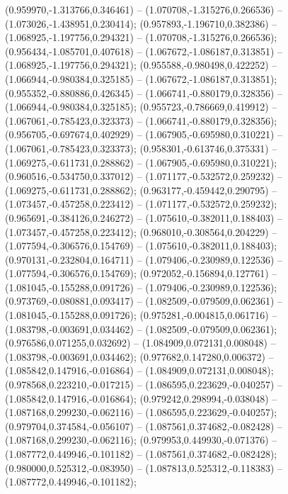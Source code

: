  (0.959970,-1.313766,0.346461) -- (1.070708,-1.315276,0.266536) -- (1.073026,-1.438951,0.230414);
 (0.957893,-1.196710,0.382386) -- (1.068925,-1.197756,0.294321) -- (1.070708,-1.315276,0.266536);
 (0.956434,-1.085701,0.407618) -- (1.067672,-1.086187,0.313851) -- (1.068925,-1.197756,0.294321);
 (0.955588,-0.980498,0.422252) -- (1.066944,-0.980384,0.325185) -- (1.067672,-1.086187,0.313851);
 (0.955352,-0.880886,0.426345) -- (1.066741,-0.880179,0.328356) -- (1.066944,-0.980384,0.325185);
 (0.955723,-0.786669,0.419912) -- (1.067061,-0.785423,0.323373) -- (1.066741,-0.880179,0.328356);
 (0.956705,-0.697674,0.402929) -- (1.067905,-0.695980,0.310221) -- (1.067061,-0.785423,0.323373);
 (0.958301,-0.613746,0.375331) -- (1.069275,-0.611731,0.288862) -- (1.067905,-0.695980,0.310221);
 (0.960516,-0.534750,0.337012) -- (1.071177,-0.532572,0.259232) -- (1.069275,-0.611731,0.288862);
 (0.963177,-0.459442,0.290795) -- (1.073457,-0.457258,0.223412) -- (1.071177,-0.532572,0.259232);
 (0.965691,-0.384126,0.246272) -- (1.075610,-0.382011,0.188403) -- (1.073457,-0.457258,0.223412);
 (0.968010,-0.308564,0.204229) -- (1.077594,-0.306576,0.154769) -- (1.075610,-0.382011,0.188403);
 (0.970131,-0.232804,0.164711) -- (1.079406,-0.230989,0.122536) -- (1.077594,-0.306576,0.154769);
 (0.972052,-0.156894,0.127761) -- (1.081045,-0.155288,0.091726) -- (1.079406,-0.230989,0.122536);
 (0.973769,-0.080881,0.093417) -- (1.082509,-0.079509,0.062361) -- (1.081045,-0.155288,0.091726);
 (0.975281,-0.004815,0.061716) -- (1.083798,-0.003691,0.034462) -- (1.082509,-0.079509,0.062361);
 (0.976586,0.071255,0.032692) -- (1.084909,0.072131,0.008048) -- (1.083798,-0.003691,0.034462);
 (0.977682,0.147280,0.006372) -- (1.085842,0.147916,-0.016864) -- (1.084909,0.072131,0.008048);
 (0.978568,0.223210,-0.017215) -- (1.086595,0.223629,-0.040257) -- (1.085842,0.147916,-0.016864);
 (0.979242,0.298994,-0.038048) -- (1.087168,0.299230,-0.062116) -- (1.086595,0.223629,-0.040257);
 (0.979704,0.374584,-0.056107) -- (1.087561,0.374682,-0.082428) -- (1.087168,0.299230,-0.062116);
 (0.979953,0.449930,-0.071376) -- (1.087772,0.449946,-0.101182) -- (1.087561,0.374682,-0.082428);
 (0.980000,0.525312,-0.083950) -- (1.087813,0.525312,-0.118383) -- (1.087772,0.449946,-0.101182);
